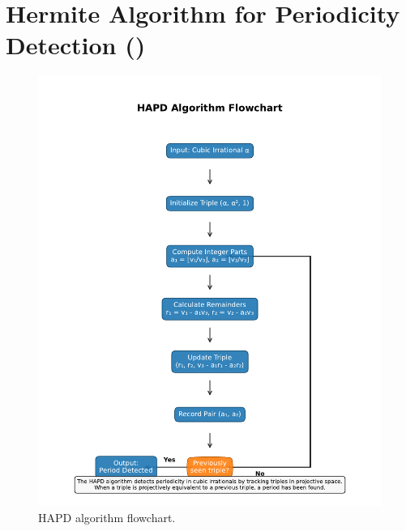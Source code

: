\section{Hermite Algorithm for Periodicity Detection (\HAPD)}\label{sec:hapd_algorithm}

\begin{figure}[htbp]
\begin{minipage}{\textwidth}
\centering
\includegraphics[width=\textwidth]{figures/output/hapd_algorithm_flowchart.pdf}
\caption{HAPD algorithm flowchart.}
\label{fig:hapd_flowchart}
\end{minipage}
\end{figure}

